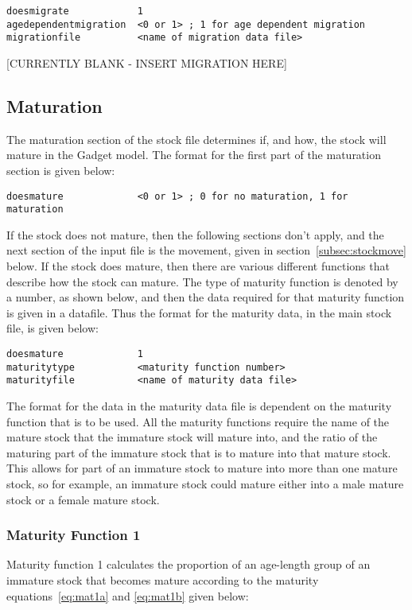\documentclass [a4paper, 10pt]{book}
\begin{document}
\begin{verbatim}
doesmigrate            1
agedependentmigration  <0 or 1> ; 1 for age dependent migration
migrationfile          <name of migration data file>
\end{verbatim}

[CURRENTLY BLANK - INSERT MIGRATION HERE]

\subsection{Maturation}\label{subsec:stockmature}
The maturation section of the stock file determines if, and how, the stock will mature in the Gadget model. The format for the first part of the maturation section is given below:

\begin{verbatim}
doesmature             <0 or 1> ; 0 for no maturation, 1 for maturation
\end{verbatim}

If the stock does not mature, then the following sections don't apply, and the next section of the input file is the movement, given in section~\ref{subsec:stockmove} below.  If the stock does mature, then there are various different functions that describe how the stock can mature.  The type of maturity function is denoted by a number, as shown below, and then the data required for that maturity function is given in a datafile.  Thus the format for the maturity data, in the main stock file, is given below:

\begin{verbatim}
doesmature             1
maturitytype           <maturity function number>
maturityfile           <name of maturity data file>
\end{verbatim}

The format for the data in the maturity data file is dependent on the maturity function that is to be used.  All the maturity functions require the name of the mature stock that the immature stock will mature into, and the ratio of the maturing part of the immature stock that is to mature into that mature stock.  This allows for part of an immature stock to mature into more than one mature stock, so for example, an immature stock could mature either into a male mature stock or a female mature stock.

\subsubsection{Maturity Function 1}
Maturity function 1 calculates the proportion of an age-length group of an immature stock that becomes mature according to the maturity equations~\ref{eq:mat1a} and \ref{eq:mat1b} given below:
\end{document}
